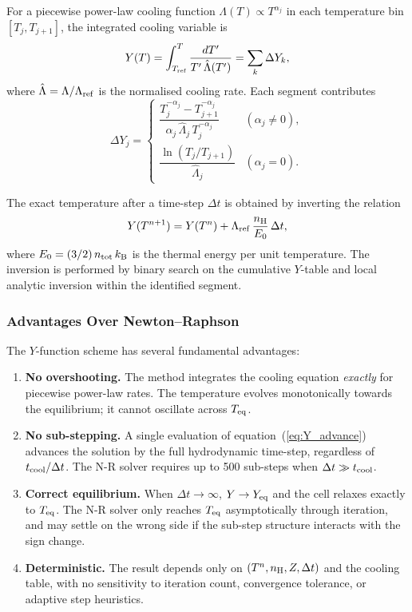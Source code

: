 \documentclass[fleqn,usenatbib]{mnras}
\begin{document}
For a piecewise power-law cooling function
$\Lambda(T) \propto T^{\alpha_j}$ in each temperature bin
$[T_j, T_{j+1}]$, the integrated cooling variable is
\begin{equation}
  Y(T) = \int_{T_{\rm ref}}^{T} \frac{dT'}{T'\,\hat{\Lambda}(T')}
  = \sum_{k} \Delta Y_k,
  \label{eq:Y_func}
\end{equation}
where $\hat{\Lambda} = \Lambda/\Lambda_{\rm ref}$ is the normalised
cooling rate.  Each segment contributes
\begin{equation}
  \Delta Y_j = \begin{cases}
    \dfrac{T_j^{-\alpha_j} - T_{j+1}^{-\alpha_j}}
          {\alpha_j\,\hat{\Lambda}_j\,T_j^{-\alpha_j}}
    & (\alpha_j \ne 0), \\[6pt]
    \dfrac{\ln(T_j/T_{j+1})}{\hat{\Lambda}_j}
    & (\alpha_j = 0).
  \end{cases}
  \label{eq:deltaY}
\end{equation}

The exact temperature after a time-step $\Delta t$ is obtained by
inverting the relation
\begin{equation}
  Y(T^{n+1}) = Y(T^n) + \Lambda_{\rm ref}\,\frac{n_{\rm H}}{E_0}\,\Delta t,
  \label{eq:Y_advance}
\end{equation}
where $E_0 = (3/2)\,n_{\rm tot}\,k_{\rm B}$ is the thermal energy per
unit temperature.  The inversion is performed by binary search on the
cumulative $Y$-table and local analytic inversion within the identified
segment.

\subsubsection{Advantages Over Newton--Raphson}

The $Y$-function scheme has several fundamental advantages:

\begin{enumerate}
  \item \textbf{No overshooting.}  The method integrates the cooling
    equation \emph{exactly} for piecewise power-law rates.  The
    temperature evolves monotonically towards the equilibrium; it cannot
    oscillate across $T_{\rm eq}$.
  \item \textbf{No sub-stepping.}  A single evaluation of
    equation~(\ref{eq:Y_advance}) advances the solution by the full
    hydrodynamic time-step, regardless of $t_{\rm cool}/\Delta t$.  The
    N-R solver requires up to 500 sub-steps when $\Delta t \gg t_{\rm cool}$.
  \item \textbf{Correct equilibrium.}  When $\Delta t \to \infty$,
    $Y \to Y_{\rm eq}$ and the cell relaxes exactly to $T_{\rm eq}$.
    The N-R solver only reaches $T_{\rm eq}$ asymptotically through
    iteration, and may settle on the wrong side if the sub-step
    structure interacts with the sign change.
  \item \textbf{Deterministic.}  The result depends only on
    $(T^n, n_{\rm H}, Z, \Delta t)$ and the cooling table, with no
    sensitivity to iteration count, convergence tolerance, or adaptive
    step heuristics.
\end{enumerate}
\end{document}
